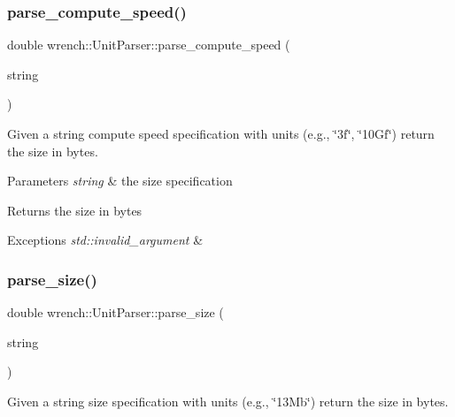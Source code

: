 \subsubsection{\texorpdfstring{parse\+\_\+compute\+\_\+speed()}{parse\_compute\_speed()}}
{\footnotesize\ttfamily double wrench\+::\+Unit\+Parser\+::parse\+\_\+compute\+\_\+speed (\begin{DoxyParamCaption}\item[{std\+::string}]{string }\end{DoxyParamCaption})\hspace{0.3cm}{\ttfamily [static]}}



Given a string compute speed specification with units (e.\+g., \char`\"{}3f\char`\"{}, \char`\"{}10\+Gf\char`\"{}) return the size in bytes. 


\begin{DoxyParams}{Parameters}
{\em string} & the size specification \\
\hline
\end{DoxyParams}
\begin{DoxyReturn}{Returns}
the size in bytes
\end{DoxyReturn}

\begin{DoxyExceptions}{Exceptions}
{\em std\+::invalid\+\_\+argument} & \\
\hline
\end{DoxyExceptions}
\mbox{\label{classwrench_1_1_unit_parser_ad57b7f7b520c57fa1faf6c97cf66973b}} 
\subsubsection{\texorpdfstring{parse\+\_\+size()}{parse\_size()}}
{\footnotesize\ttfamily double wrench\+::\+Unit\+Parser\+::parse\+\_\+size (\begin{DoxyParamCaption}\item[{std\+::string}]{string }\end{DoxyParamCaption})\hspace{0.3cm}{\ttfamily [static]}}



Given a string size specification with units (e.\+g., \char`\"{}13\+Mb\char`\"{}) return the size in bytes. 


